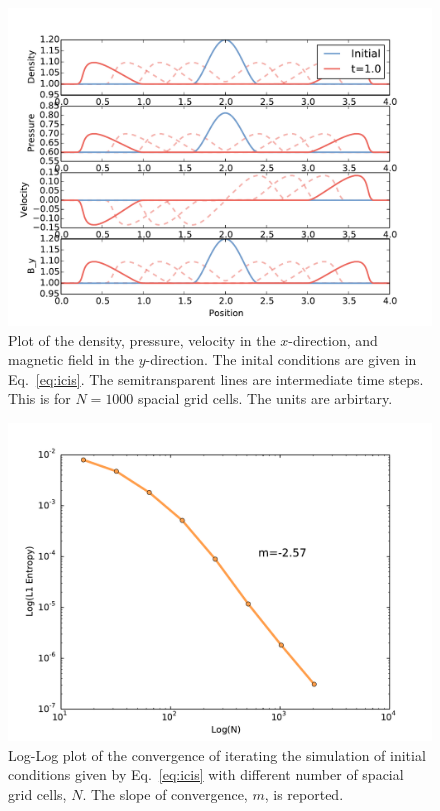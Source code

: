 \documentclass[iop,twocolumn]{emulateapj}
\begin{document}
\begin{figure}[htb!]
\includegraphics[scale=.9,trim=0cm 0cm 0cm 0cm,clip]{f2.pdf}
\caption{Plot of the density, pressure, velocity in the $x$-direction, and magnetic field in the $y$-direction. The inital conditions are given in Eq.~\ref{eq:icis}. The semitransparent lines are intermediate time steps. This is for $N=1000$ spacial grid cells. The units are arbirtary. \label{fig:f2}}
\end{figure}
\begin{figure}[htb!]
\includegraphics[scale=.9,trim=0cm 0cm 0cm 0cm,clip]{f3.pdf}
\caption{Log-Log plot of the convergence of iterating the simulation of initial conditions given by Eq.~\ref{eq:icis} with different number of spacial grid cells, $N$. The slope of convergence, $m$, is reported. \label{fig:f3}}
\end{figure}


\end{document}
